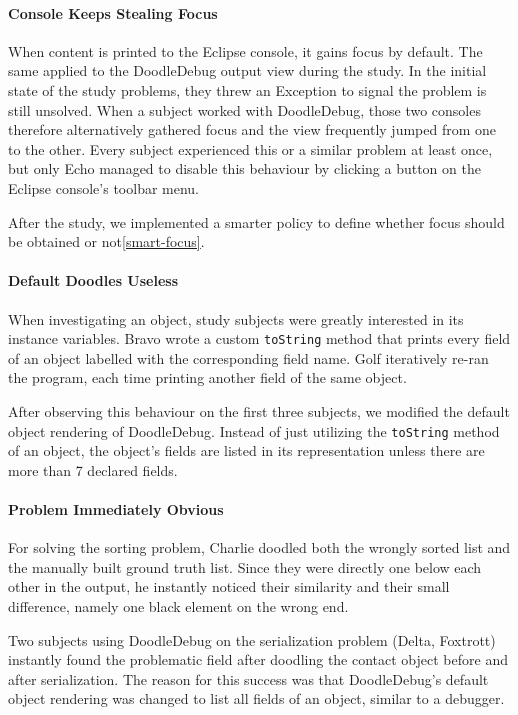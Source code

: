 \documentclass[english]{scrartcl}
\newcommand{\nb}[2]{\nbc{#1}{#2}{orange}}
\newcommand\todo[1]{\nb{TO DO}{#1}}
\newcommand{\DD}{Dood\-le\-De\-bug\xspace}
\begin{document}
\paragraph{Console Keeps Stealing Focus}
When content is printed to the Eclipse console, it gains focus by default.
The same applied to the \DD output view during the study.
In the initial state of the study problems, they threw an Exception to signal the problem is still unsolved.
When a subject worked with \DD, those two consoles therefore alternatively gathered focus and the view frequently jumped from one to the other.
Every subject experienced this or a similar problem at least once, but only Echo managed to disable this behaviour by clicking a button on the Eclipse console's toolbar menu.

After the study, we implemented a smarter policy to define whether focus should be obtained or not\ref{smart-focus}\todo{refer to "Notification" here}.

\paragraph{Default Doodles Useless}
When investigating an object, study subjects were greatly interested in its instance variables.
Bravo wrote a custom \texttt{toString} method that prints every field of an object labelled with the corresponding field name.
Golf iteratively re-ran the program, each time printing another field of the same object.

After observing this behaviour on the first three subjects, we modified the default object rendering of \DD.
Instead of just utilizing the \texttt{toString} method of an object, the object's fields are listed in its representation unless there are more than 7 declared fields.

\paragraph{Problem Immediately Obvious}
For solving the sorting problem, Charlie doodled both the wrongly sorted list and the manually built ground truth list.
Since they were directly one below each other in the output, he instantly noticed their similarity and their small difference, namely one black element on the wrong end.

Two subjects using \DD on the serialization problem (Delta, Foxtrott) instantly found the problematic field after doodling the contact object before and after serialization.
The reason for this success was that \DD's default object rendering was changed to list all fields of an object, similar to a debugger.
\end{document}
